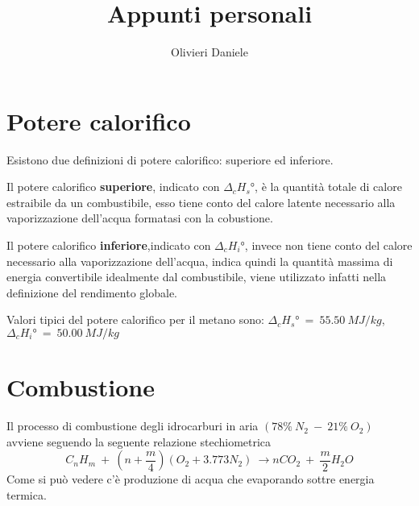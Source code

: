\documentclass[a4paper,10pt]{article}
\title{Appunti personali}
\author{Olivieri Daniele}
\begin{document}
\maketitle
\section{Potere calorifico}
\label{sec:potere_calorifico}
Esistono due definizioni di potere calorifico: superiore ed inferiore.

Il potere calorifico \textbf{superiore}, indicato con $\Delta_c H_s\text{°}$, è la quantità totale di calore estraibile da un combustibile, esso tiene conto del calore latente necessario alla vaporizzazione dell'acqua formatasi con la cobustione.

Il potere calorifico \textbf{inferiore},indicato con $\Delta_c H_i\text{°}$, invece non tiene conto del calore necessario alla vaporizzazione dell'acqua, indica quindi la quantità massima di energia convertibile idealmente dal combustibile, viene utilizzato infatti nella definizione del rendimento globale.

Valori tipici del potere calorifico per il metano sono: $\Delta_c H_s\text{°}\ =\ 55.50\ MJ/kg$, $\Delta_c H_i\text{°}\ =\ 50.00\ MJ/kg$

\section{Combustione}
\label{sec:combustione}
Il processo di combustione degli idrocarburi in aria $\left(78\%\ N_2\ -\ 21\%\ O_2 \right)$ avviene seguendo la seguente relazione stechiometrica
\[C_n H_m\ +\ \left(n+\frac{m}{4}\right)\left(O_2+3.773N_2\right)\ \rightarrow nCO_2\ +\ \frac{m}{2}H_2O \]
Come si può vedere c'è produzione di acqua che evaporando sottre energia termica.
\end{document}
